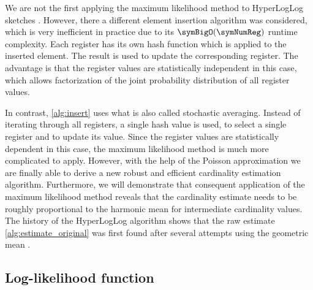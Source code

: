 \documentclass[a4paper]{scrartcl}
\begin{document}
We are not the first applying the maximum likelihood method to HyperLogLog sketches \cite{Clifford2012}. However, there a different element insertion algorithm was considered, which is very inefficient in practice due to its $\symBigO(\symNumReg)$ runtime complexity. Each register has its own hash function which is applied to the inserted element. The result is used to update the corresponding register. The advantage is that the register values are statistically independent in this case, which allows factorization of the joint probability distribution of all register values. 

In contrast, \cref{alg:insert} uses what is also called stochastic averaging. Instead of iterating through all registers, a single hash value is used, to select a single register and to update its value. Since the register values are statistically dependent in this case, the maximum likelihood method is much more complicated to apply. However, with the help of the Poisson approximation we are finally able to derive a new robust and efficient cardinality estimation algorithm. Furthermore, we will demonstrate that consequent application of the maximum likelihood method reveals that the cardinality estimate needs to be roughly proportional to the harmonic mean for intermediate cardinality values. The history of the HyperLogLog algorithm shows that the raw estimate \eqref{alg:estimate_original} was first found after several attempts using the geometric mean \cite{Flajolet2007, Durand2003}.

\subsection{Log-likelihood function}
\end{document}
